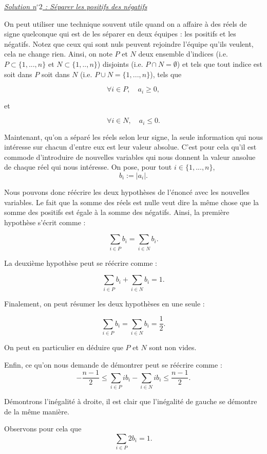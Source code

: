 \begin{sol}

\underline{\textit{Solution n$^\circ 2$ : Séparer les positifs des négatifs}}

On peut utiliser une technique souvent utile quand on a affaire à des réels de signe quelconque qui est de les séparer en deux équipes : les positifs et les négatifs. Notez que ceux qui sont nuls peuvent rejoindre l'équipe qu'ils veulent, cela ne change rien. Ainsi, on note $P$ et $N$ deux ensemble d'indices (i.e. $P \subset \{1,...,n\}$ et $N \subset \{1,..,n\}$) disjoints (i.e. $P \cap N = \emptyset$) et tels que tout indice est soit dans $P$ soit dans $N$ (i.e. $P \cup N =\{1,...,n\}$), tels que 

\[
\forall i \in P, \quad a_i \geq 0,
\]

et

\[
\forall i \in N, \quad a_i \leq 0.
\]

Maintenant, qu'on a séparé les réels selon leur signe, la seule information qui nous intéresse sur chacun d'entre eux est leur valeur absolue. C'est pour cela qu'il est commode d'introduire de nouvelles variables qui nous donnent la valeur ansolue de chaque réel qui nous intéresse. On pose, pour tout $i \in \{1,...,n\}$,
\[
b_i := \vert a_i \vert.
\]

Nous pouvons donc réécrire les deux hypothèses de l'énoncé avec les nouvelles variables. Le fait que la somme des réels est nulle veut dire la même chose que la somme des positifs est égale à la somme des négatifs. Ainsi, la première hypothèse s'écrit comme :

\[
\sum_{i \in P} b_i = \sum_{i \in N} b_i.
\]

La deuxième hypothèse peut se réécrire comme :

\[
\sum_{i \in P} b_i + \sum_{i \in N} b_i =1.
\]

Finalement, on peut résumer les deux hypothèses en une seule :

\[
\sum_{i \in P} b_i = \sum_{i \in N} b_i = \frac12.
\]

On peut en particulier en déduire que $P$ et $N$ sont non vides.

Enfin, ce qu'on nous demande de démontrer peut se réécrire comme :
\[
-\frac{n-1}2 \leq \sum_{i \in P} ib_i - \sum_{i \in N} ib_i \leq \frac{n-1}2.
\]

Démontrons l'inégalité à droite, il est clair que l'inégalité de gauche se démontre de la même manière.

Observons pour cela que
\[
\sum_{i \in P} 2b_i =1.
\]


\end{sol}
